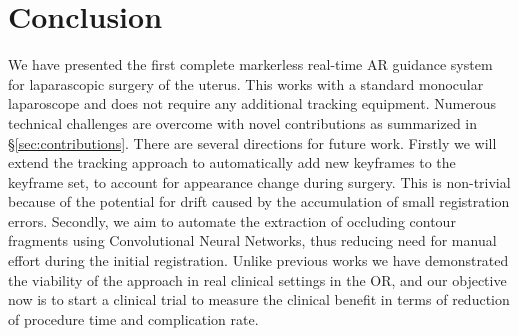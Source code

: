 \documentclass[journal]{IEEEtran}
\begin{document}











  
\section{Conclusion}
\label{sec:conclusion}
We have presented the first complete markerless real-time AR guidance system for laparascopic surgery of the uterus. This works with a standard monocular laparoscope and does not require any additional tracking equipment. Numerous technical challenges are overcome with novel contributions as summarized in \S\ref{sec:contributions}. There are several directions for future work. Firstly we will extend the tracking approach to automatically add new keyframes to the keyframe set, to account for appearance change during surgery. This is non-trivial because of the potential for drift caused by the accumulation of small registration errors. Secondly, we aim to automate the extraction of occluding contour fragments using Convolutional Neural Networks, thus reducing need for manual effort during the initial registration. Unlike previous works we have demonstrated the viability of the approach in real clinical settings in the OR, and our objective now is to start a clinical trial to measure the clinical benefit in terms of reduction of procedure time and complication rate.
\end{document}
